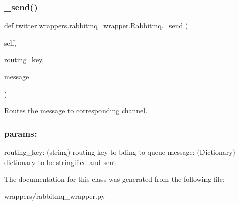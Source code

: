\subsubsection{\texorpdfstring{\+\_\+send()}{\_send()}}
{\footnotesize\ttfamily def twitter.\+wrappers.\+rabbitmq\+\_\+wrapper.\+Rabbitmq.\+\_\+send (\begin{DoxyParamCaption}\item[{}]{self,  }\item[{}]{routing\+\_\+key,  }\item[{}]{message }\end{DoxyParamCaption})\hspace{0.3cm}{\ttfamily [private]}}



Routes the message to corresponding channel. 

\subsubsection*{params\+: }

routing\+\_\+key\+: (string) routing key to bding to queue message\+: (Dictionary) dictionary to be stringified and sent 

The documentation for this class was generated from the following file\+:\begin{DoxyCompactItemize}
\item 
wrappers/rabbitmq\+\_\+wrapper.\+py\end{DoxyCompactItemize}
